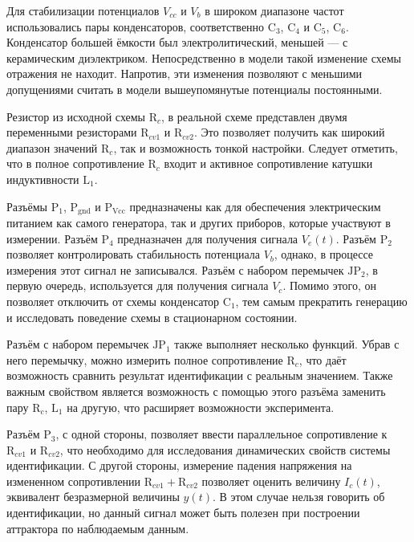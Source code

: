 Для стабилизации потенциалов $V_{cc}$ и $V_b$
в широком диапазоне частот использовались пары конденсаторов, соответственно
$\mathrm{C}_3$, $\mathrm{C}_4$ и
$\mathrm{C}_5$, $\mathrm{C}_6$. Конденсатор большей ёмкости
был электролитический, меньшей --- с керамическим диэлектриком.
Непосредственно в модели такой изменение схемы отражения не находит.
Напротив, эти изменения позволяют с меньшими допущениями считать
в модели вышеупомянутые потенциалы постоянными.

Резистор из исходной схемы $\mathrm{R}_c$,
в реальной схеме представлен двумя переменными резисторами
$\mathrm{R}_{cv1}$ и
$\mathrm{R}_{cv2}$. Это позволяет получить как широкий диапазон значений $\mathrm{R}_c$,
так и возможность тонкой настройки.
Следует отметить, что в полное сопротивление $\mathrm{R}_c$
входит и активное сопротивление катушки индуктивности $\mathrm{L}_{1}$.

Разъёмы $\mathrm{P}_1$, $\mathrm{P}_\mathrm{gnd}$ и $\mathrm{P}_\mathrm{Vcc}$
предназначены как для обеспечения электрическим питанием как самого генератора,
так и других приборов, которые участвуют в измерении.
Разъём $\mathrm{P}_4$ предназначен для получения сигнала $V_e(t)$.
Разъём $\mathrm{P}_2$ позволяет контролировать стабильность
потенциала $V_b$, однако, в процессе измерения этот сигнал не записывался.
Разъём с набором перемычек $\mathrm{JP}_2$, в первую очередь,
используется для получения сигнала $V_c$. Помимо этого,
он позволяет отключить от схемы конденсатор $\mathrm{C}_1$,
тем самым прекратить генерацию и исследовать поведение схемы в стационарном состоянии.

Разъём с набором перемычек $\mathrm{JP}_1$ также выполняет несколько функций.
Убрав с него перемычку, можно измерить полное сопротивление $\mathrm{R}_{c}$,
что даёт возможность сравнить результат идентификации с реальным значением.
Также важным свойством является возможность с помощью этого разъёма
заменить пару $\mathrm{R}_{c}$, $\mathrm{L}_{1}$
на другую, что расширяет возможности эксперимента.

Разъём  $\mathrm{P}_{3}$, с одной стороны, позволяет
ввести параллельное сопротивление к
$\mathrm{R}_{cv1}$ и
$\mathrm{R}_{cv2}$, что необходимо для исследования динамических
свойств системы идентификации. С другой стороны,
измерение падения напряжения на измененном сопротивлении $\mathrm{R}_{cv1} +\mathrm{R}_{cv2}$
позволяет оценить величину $I_c(t)$, эквивалент безразмерной величины $y(t)$.
В этом случае нельзя говорить об идентификации, но данный сигнал может быть полезен
при построении аттрактора по наблюдаемым данным.


